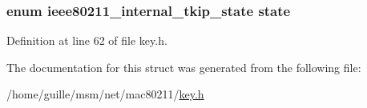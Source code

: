 \hypertarget{structtkip__ctx_aa20c2a9452e9ce568def7cce7ca256b3}{
\subsubsection[{state}]{\setlength{\rightskip}{0pt plus 5cm}enum {\bf ieee80211\-\_\-internal\-\_\-tkip\-\_\-state} state}}\label{structtkip__ctx_aa20c2a9452e9ce568def7cce7ca256b3}


Definition at line 62 of file key.\-h.



The documentation for this struct was generated from the following file\-:\begin{DoxyCompactItemize}
\item 
/home/guille/msm/net/mac80211/\hyperlink{key_8h}{key.\-h}\end{DoxyCompactItemize}
